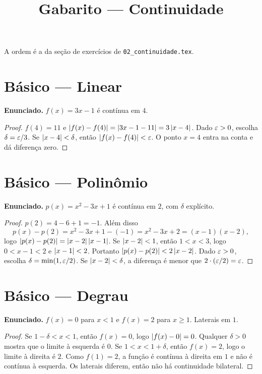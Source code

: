\documentclass[11pt,a4paper]{article}
\title{Gabarito --- Continuidade}
\author{}
\date{}
\begin{document}
\maketitle
\tableofcontents

A ordem \'e a da se\c{c}\~ao de exerc\'icios de \texttt{02\_continuidade.tex}.

\section{B\'asico --- Linear}

\textbf{Enunciado.} $f(x)=3x-1$ \'e cont\'inua em $4$.

\begin{proof}
$f(4)=11$ e $\left\lvert f(x)-f(4) \right\rvert=\left\lvert 3x-1-11 \right\rvert=3\left\lvert x-4 \right\rvert$. Dado $\varepsilon>0$, escolha $\delta=\varepsilon/3$. Se $\left\lvert x-4 \right\rvert<\delta$, ent\~ao $\left\lvert f(x)-f(4) \right\rvert<\varepsilon$. O ponto $x=4$ entra na conta e d\'a diferen\c{c}a zero.
\end{proof}

\section{B\'asico --- Polin\^omio}

\textbf{Enunciado.} $p(x)=x^2-3x+1$ \'e cont\'inua em $2$, com $\delta$ expl\'icito.

\begin{proof}
$p(2)=4-6+1=-1$. Al\'em disso
\[
p(x)-p(2)=x^2-3x+1-(-1)=x^2-3x+2=(x-1)(x-2),
\]
logo $\left\lvert p(x)-p(2) \right\rvert=\left\lvert x-2 \right\rvert\left\lvert x-1 \right\rvert$. Se $\left\lvert x-2 \right\rvert<1$, ent\~ao $1<x<3$, logo $0<x-1<2$ e $\left\lvert x-1 \right\rvert<2$. Portanto $\left\lvert p(x)-p(2) \right\rvert<2\left\lvert x-2 \right\rvert$. Dado $\varepsilon>0$, escolha $\delta=\min(1,\varepsilon/2)$. Se $\left\lvert x-2 \right\rvert<\delta$, a diferen\c{c}a \'e menor que $2\cdot(\varepsilon/2)=\varepsilon$.
\end{proof}

\section{B\'asico --- Degrau}

\textbf{Enunciado.} $f(x)=0$ para $x<1$ e $f(x)=2$ para $x\ge 1$. Laterais em $1$.

\begin{proof}
Se $1-\delta<x<1$, ent\~ao $f(x)=0$, logo $\left\lvert f(x)-0 \right\rvert=0$. Qualquer $\delta>0$ mostra que o limite \`a esquerda \'e $0$. Se $1<x<1+\delta$, ent\~ao $f(x)=2$, logo o limite \`a direita \'e $2$. Como $f(1)=2$, a fun\c{c}\~ao \'e cont\'inua \`a direita em $1$ e n\~ao \'e cont\'inua \`a esquerda. Os laterais diferem, ent\~ao n\~ao h\'a continuidade bilateral.
\end{proof}
\end{document}
